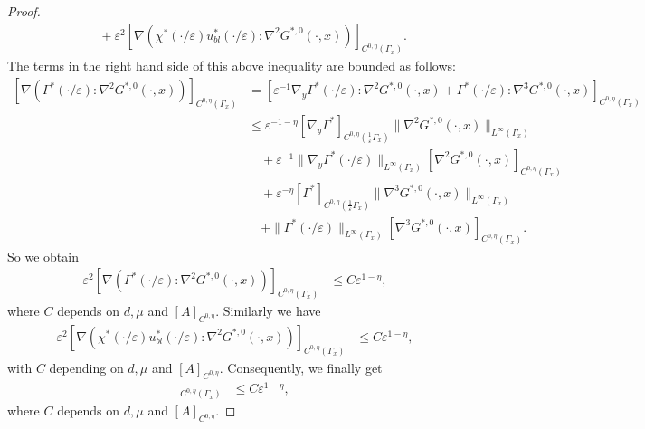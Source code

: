\documentclass[11pt, reqno]{amsart}
\theoremstyle{definition}
\theoremstyle{remark}
\numberwithin{equation}{section}
\begin{document}
\begin{proof}
\begin{align*}
			&\qquad	+ \varepsilon^2\left[ \nabla \left(\chi^* (\cdot/\varepsilon)u^*_{bl}(\cdot/\varepsilon): \nabla^2 G^{*,0}  (\cdot,x)\right) \right]_{C^{0,\eta}(\Gamma_x)} .
		\end{align*}
		The terms in the right hand side of this above inequality are bounded as follows:
		\begin{align*}
			\left[\nabla \left(\Gamma^*(\cdot/\varepsilon): \nabla^2 G^{*,0}  (\cdot,x)\right)\right]_{C^{0,\eta}(\Gamma_x)}&
			= [  \varepsilon^{-1}\nabla_y \Gamma^*(\cdot/\varepsilon) :\nabla^2 G^{*,0} (\cdot,x)+ \Gamma^*(\cdot/\varepsilon): \nabla^3 G^{*,0} (\cdot,x)   ]_{C^{0,\eta}(\Gamma_x)}\\
			&\leq      \varepsilon^{-1-\eta}[\nabla_y \Gamma^* ]_{C^{0,\eta}(\frac{1}{\varepsilon}\Gamma_x)}\|\nabla^2 G^{*,0} (\cdot,x)\|_{L^\infty(\Gamma_x)}\\
			&\quad +    \varepsilon^{-1}\| \nabla_y \Gamma^*(\cdot/\varepsilon)\|_{L^\infty(\Gamma_x)} [\nabla^2 G^{*,0} (\cdot,x) ]_{C^{0,\eta}(\Gamma_x)}  \\
			& \quad+\varepsilon^{-\eta}[\Gamma^* ]_{C^{0,\eta}(\frac{1}{\varepsilon}\Gamma_x)}\|\nabla^3 G^{*,0} (\cdot,x)\|_{L^\infty(\Gamma_x)}\\
			&\quad + \| \Gamma^*(\cdot/\varepsilon)\|_{L^\infty(\Gamma_x)} \left[\nabla^3 G^{*,0} (\cdot,x)  \right ]_{C^{0,\eta}(\Gamma_x)}.
		\end{align*}
		So we obtain 
		\begin{align*}
			\varepsilon^2 \left[\nabla \left(\Gamma^*(\cdot/\varepsilon): \nabla^2 G^{*,0}  (\cdot,x)\right)\right]_{C^{0,\eta}(\Gamma_x)}  &\leq    C  \varepsilon^{1-\eta},
		\end{align*}where $C $ depends on $d,\mu$ and $[A]_{C^{0,\eta}}.$
		Similarly we have
		\begin{align*}
			\varepsilon^2	\left[\nabla \left(  \chi^* (\cdot/\varepsilon)u^*_{bl}(\cdot/\varepsilon)\!:\! \nabla^2 G^{*,0}  (\cdot,x)  \right)\right]_{C^{0,\eta}(\Gamma_x)}
			&\leq    C  \varepsilon^{1-\eta},
		\end{align*}with $C $ depending on $d,\mu$ and $[A]_{C^{0,\eta}}.$ 
	Consequently, we finally get 
		\begin{align*}
			[\nabla_{\!\!\textup{ tan}}\; \varphi^\varepsilon]_{C^{0,\eta}(\Gamma_x)}  &\leq    C   \varepsilon^{1-\eta} ,
		\end{align*}
		where $C$ depends on $d,\mu$ and $[A]_{C^{0,\eta}}.$ 	\end{proof}
	
\end{document}
